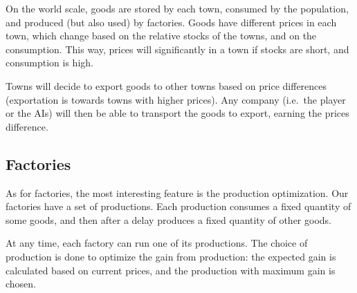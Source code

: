\documentclass{article}
\begin{document}
On the world scale, goods are stored by each town, consumed by the population, and produced (but also used) by factories.
Goods have different prices in each town, which change based on the relative stocks of the towns, and on the consumption.
This way, prices will significantly in a town if stocks are short, and consumption is high.

Towns will decide to export goods to other towns based on price differences (exportation is towards towns with higher prices).
Any company (i.e.\ the player or the AIs) will then be able to transport the goods to export, earning the prices difference.

\subsection{Factories}
As for factories, the most interesting feature is the production optimization.
Our factories have a set of productions.
Each production consumes a fixed quantity of some goods, and then after a delay produces a fixed quantity of other goods.

At any time, each factory can run one of its productions.
The choice of production is done to optimize the gain from production: the expected gain is calculated based on current prices,
and the production with maximum gain is chosen.
\end{document}
